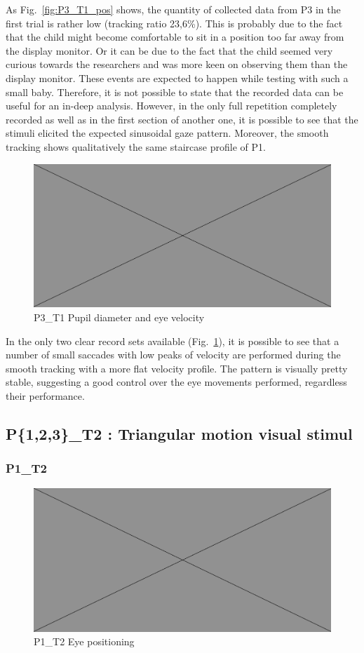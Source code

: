As Fig.~\ref{fig:P3_T1_pos} shows, the quantity of collected data from P3 in the first trial is rather low (tracking ratio 23,6\%). This is probably due to the fact that the child might become comfortable to sit in a position too far away from the display monitor. Or it can be due to the fact that the child seemed very curious towards the researchers and was more keen on observing them than the display monitor. These events are expected to happen while testing with such a small baby. Therefore, it is not possible to state that the recorded data can be useful for an in-deep analysis. However, in the only full repetition completely recorded as well as in the first section of another one, it is possible to see that the stimuli elicited the expected sinusoidal gaze pattern. Moreover, the smooth tracking shows qualitatively the same staircase profile of P1.

\begin{figure}[h]
  \centering
  \includegraphics[width=.5\textwidth]{figures/placeholderImg.jpg}
  \caption[P3\_T1 pupil velocity]{P3\_T1 Pupil diameter and eye velocity}
  \label{fig:P3_T1_vel}
\end{figure}

In the only two clear record sets available (Fig.~\ref{fig:P3_T1_vel}), it is possible to see that a number of small saccades with low peaks of velocity are performed during the smooth tracking with a more flat velocity profile. The pattern is visually pretty stable, suggesting a good control over the eye movements performed, regardless their performance.



\subsection{P\{1,2,3\}\_T2 : Triangular motion visual stimul}
\label{sec:P123_T2}

\subsubsection{P1\_T2}
\label{sec:P1_T2}

\begin{figure}[h]
  \centering
  \includegraphics[width=.5\textwidth]{figures/placeholderImg.jpg}
  \caption[P1\_T2 Eye positioning]{P1\_T2 Eye positioning}
  \label{fig:P1_T2_pos}
\end{figure}

